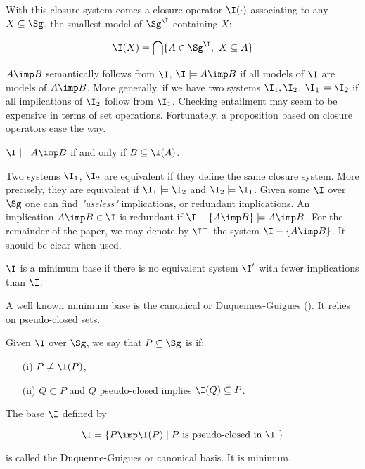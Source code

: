 \documentclass[a4paper, 10pt]{article}
\begin{document}
With this closure system comes a closure operator $\I(\cdot)$ associating to any $X \subseteq \Sg$, the smallest model of $\Sg^{\I}$ containing $X$:

 \[ \I(X) = \bigcap \{A \in \Sg^{\I},\  X \subseteq A \} \]
 
$A \imp B$ semantically follows from $\I$, $\I \models A \imp B$ if all models of $\I$ are models of $A \imp B$. More generally, if we have two systems $\I_1, \I_2$, $\I_1 \models \I_2$ if all implications of $\I_2$ follow from $\I_1$. Checking entailment may seem to be expensive in terms of set operations. Fortunately, a proposition based on closure operators ease the way.

\begin{proposition} $\I \models A \imp B$ if and only if $B \subseteq \I(A)$.
	\end{proposition}
	
Two systems $\I_1$, $\I_2$ are equivalent if they define the same closure system. More precisely, they are equivalent if $\I_1 \models \I_2$ and $\I_2 \models \I_1$. Given some $\I$ over $\Sg$ one can find \textit{"useless"} implications, or redundant implications. An implication $A \imp B \in \I$ is redundant if $\I - \{ A \imp B \} \models A \imp B$. For the remainder of the paper, we may denote by $\I^{-}$ the system $\I - \{ A \imp B \}$. It should be clear when used. 

\begin{definition} $\I$ is a minimum base if there is no equivalent system $\I'$ with fewer implications than $\I$.
	
\end{definition}

A well known minimum base is the canonical or Duquennes-Guigues (\cite{guigues_familles_1986}). It relies on pseudo-closed sets.

\begin{definition} Given $\I$ over $\Sg$, we say
	that $P \subseteq \Sg$ is  if:
	\begin{itemize}
		\item[(i)] $P \neq \I(P)$,
		\item[(ii)] $Q \subset P$ and $Q$ pseudo-closed implies $\I(Q) 
		\subseteq P$.
	\end{itemize}
\end{definition}

\begin{definition} The base $\I$ defined by
	
	\[ \I = \{ P \imp \I(P) \; | \; P \text{ is pseudo-closed in $\I$ } \} \]
	
\noindent is called the Duquenne-Guigues or canonical basis. It is minimum.
	
\end{definition}
\end{document}
